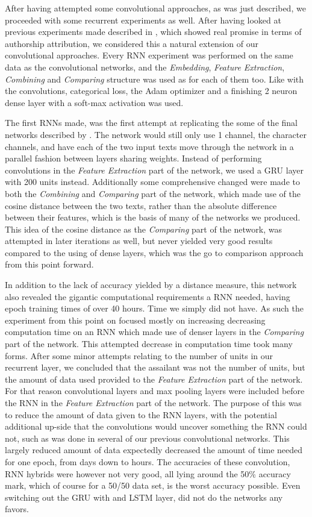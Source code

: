 After having attempted some convolutional approaches, as was just described,
we proceeded with some recurrent experiments as well. After having looked at
previous experiments made described in \cite{qian:2018}, which showed real
promise in terms of authorship attribution, we considered this a natural
extension of our convolutional approaches. Every \gls{RNN} experiment
was performed on the same data as the convolutional networks, and the
\textit{Embedding}, \textit{Feature Extraction}, \textit{Combining} and
\textit{Comparing} structure was used as for each of them too. Like with the
convolutions, categorical loss, the Adam optimizer and a finishing 2 neuron
dense layer with a soft-max activation was used.

The first \gls{RNN}s made, was the first attempt at replicating the some of
the final networks described by \cite{qian:2018}. The network would still only
use 1 channel, the character channels, and have each of the two input texts
move through the network in a parallel fashion between layers sharing weights.
Instead of performing convolutions in the \textit{Feature Extraction} part of
the network, we used a \gls{GRU} layer with 200 units instead. Additionally
some comprehensive changed were made to both the \textit{Combining} and
\textit{Comparing} part of the network, which made use of the cosine distance
between the two texts, rather than the absolute difference between their
features, which is the basis of many of the networks we produced. This idea of
the cosine distance as the \textit{Comparing} part of the network, was attempted
in later iterations as well, but never yielded very good results compared to the
using of dense layers, which was the go to comparison approach from this point
forward.

In addition to the lack of accuracy yielded by a distance measure, this network
also revealed the gigantic computational requirements a \gls{RNN} needed,
having epoch training times of over 40 hours. Time we simply did not have. As
such the experiment from this point on focused mostly on increasing decreasing
computation time on an \gls{RNN} which made use of denser layers in the
\textit{Comparing} part of the network. This attempted decrease in computation
time took many forms. After some minor attempts relating to the number of units
in our recurrent layer, we concluded that the assailant was not the number of
units, but the amount of data used provided to the \textit{Feature Extraction}
part of the network. For that reason convolutional layers and max pooling layers
were included before the \gls{RNN} in the \textit{Feature Extraction} part of
the network. The purpose of this was to reduce the amount of data given to the
\gls{RNN} layers, with the potential additional up-side that the convolutions
would uncover something the \gls{RNN} could not, such as was done in several
of our previous convolutional networks. This largely reduced amount of data
expectedly decreased the amount of time needed for one epoch, from days down to
hours. The accuracies of these convolution, \gls{RNN} hybrids were however not
very good, all lying around the 50\% accuracy mark, which of course for a 50/50
data set, is the worst accuracy possible. Even switching out the \gls{GRU} with
and \gls{LSTM} layer, did not do the networks any favors.

